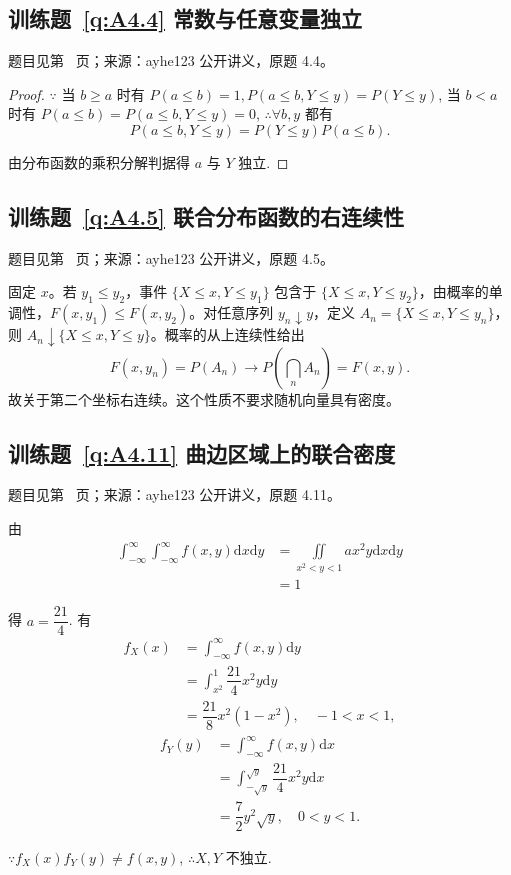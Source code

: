 \documentclass[UTF8,12pt,a4paper,fontset=fandol]{ctexbook}
\begin{document}
\subsection*{训练题~\ref{q:A4.4} 常数与任意变量独立}\label{a:A4.4}{\small 题目见第~\pageref{q:A4.4} 页；来源：ayhe123 公开讲义，原题 4.4。}
\begin{proof}
    $\because$ 当 $b\geq a$ 时有 $P(a\leq b)=1,P(a\leq b,Y\leq y)=P(Y\leq y)$, 当 $b<a$ 时有 $P(a\leq b)=P(a\leq b,Y\leq y)=0$, $\therefore\forall b,y$ 都有
    \[P(a\leq b,Y\leq y)=P(Y\leq y)P(a\leq b).\]

    由分布函数的乘积分解判据得 $a$ 与 $Y$ 独立.
\end{proof}

\subsection*{训练题~\ref{q:A4.5} 联合分布函数的右连续性}\label{a:A4.5}{\small 题目见第~\pageref{q:A4.5} 页；来源：ayhe123 公开讲义，原题 4.5。}
\begin{solve}固定 $x$。若 $y_1\le y_2$，事件 $\{X\le x,Y\le y_1\}$ 包含于 $\{X\le x,Y\le y_2\}$，由概率的单调性，$F(x,y_1)\le F(x,y_2)$。对任意序列 $y_n\downarrow y$，定义 $A_n=\{X\le x,Y\le y_n\}$，则 $A_n\downarrow\{X\le x,Y\le y\}$。概率的从上连续性给出\[F(x,y_n)=P(A_n)\longrightarrow P\left(\bigcap_nA_n\right)=F(x,y).\]故关于第二个坐标右连续。这个性质不要求随机向量具有密度。\end{solve}

\subsection*{训练题~\ref{q:A4.11} 曲边区域上的联合密度}\label{a:A4.11}{\small 题目见第~\pageref{q:A4.11} 页；来源：ayhe123 公开讲义，原题 4.11。}
\begin{solve}
    由
    \[\begin{aligned}\int_{-\infty}^\infty\int_{-\infty}^\infty f(x,y)\mathrm{d}x\mathrm{d}y&=\iint\limits_{x^2<y<1}ax^2y\mathrm{d}x\mathrm{d}y\\&=1\end{aligned}\]

    得 $a=\dfrac{21}{4}$. 有
    \[\begin{aligned}f_X(x)&=\int_{-\infty}^\infty f(x,y)\mathrm{d}y\\&=\int_{x^2}^1\dfrac{21}{4}x^2y\mathrm{d}y\\&=\dfrac{21}{8}x^2(1-x^2),\quad -1<x<1,\end{aligned}\]
    \[\begin{aligned}f_Y(y)&=\int_{-\infty}^\infty f(x,y)\mathrm{d}x\\&=\int_{-\sqrt{y}}^{\sqrt{y}}\dfrac{21}{4}x^2y\mathrm{d}x\\&=\dfrac{7}{2}y^2\sqrt{y},\quad 0<y<1.\end{aligned}\]

    $\because f_X(x)f_Y(y)\neq f(x,y)$, $\therefore X,Y$ 不独立.
\end{solve}
\end{document}
